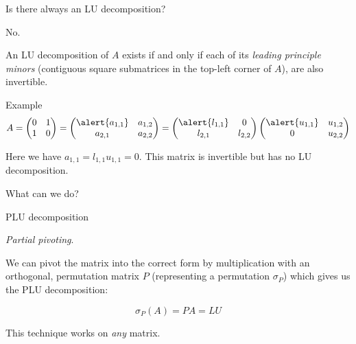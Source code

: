 \documentclass{beamer}
\begin{document}
\begin{frame}{Is there always an LU decomposition?}

    \alert{No.}

    An LU decomposition of $A$ exists if and only if each of its \emph{leading principle minors}
    (contiguous square submatrices in the top-left corner of $A$),
    are also invertible.

    \pause{}

    \begin{exampleblock}{Example}
        \[
            A = \begin{pmatrix}{}
                0 & 1 \\
                1 & 0
            \end{pmatrix} 
            
              = \begin{pmatrix}{}
                \alert{a_{1,1}} & a_{1,2} \\
                a_{2,1} & a_{2,2}
            \end{pmatrix}
              = \begin{pmatrix}{}
                    \alert{l_{1,1}} & 0 \\
                    l_{2,1} & l_{2,2}
                \end{pmatrix}
                \begin{pmatrix}{}
                    \alert{u_{1,1}} & u_{1,2} \\
                    0 & u_{2,2}
                \end{pmatrix}
        \]
        
        Here we have $a_{1,1} = l_{1,1}u_{1,1} = 0.$
        \bigbreak
        This matrix is invertible but has no LU decomposition.
    \end{exampleblock}

    \pause{}

    \begin{alertblock}{}
        What can we do?
    \end{alertblock}

\end{frame}

\begin{frame}{PLU decomposition}

    \emph{Partial pivoting}.

    We can pivot the matrix into the correct form by multiplication with
    an orthogonal, permutation matrix $P$ (representing a permutation $\sigma_P$)
    which gives us the PLU decomposition:

    \[
        \sigma_P(A) = PA = LU
    \]

    \pause{}

    \begin{block}{}
        This technique works on \emph{any} matrix.
    \end{block}

\end{frame}
\end{document}
